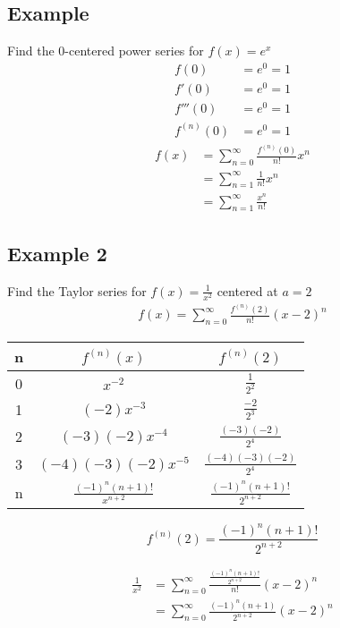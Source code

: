 \documentclass{article}
\theoremstyle{mytheoremstyle}
\theoremstyle{mytheoremstyle}
\theoremstyle{myproblemstyle}
\begin{document}
    \subsection*{Example}
    Find the 0-centered power series for $f(x)=e^x$
    \begin{align*}
        f(0) &= e^0 = 1 \\
        f'(0) &= e^0 = 1 \\
        f'''(0) &= e^0 = 1 \\
        f^{(n)}(0) &= e^0 = 1
    \end{align*}
    \begin{align*}
        f(x) &= \sum_{n=0}^{\infty} \frac{f^{(n)}(0)}{n!} x^n \\
             &= \sum_{n=1}^{\infty} \frac{1}{n!} x^n \\
             &= \sum_{n=1}^{\infty} \frac{x^n}{n!}
    \end{align*}

    \subsection*{Example 2}
    Find the Taylor series for $f(x) = \frac{1}{x^2}$ centered at $a=2$
    \begin{align*}
        f(x) = \sum_{n=0}^{\infty} \frac{f^{(n)}(2)}{n!} (x-2)^n
    \end{align*}
    \begin{center}
    \renewcommand{\arraystretch}{2}
    \begin{tabular}[c]{c|c|c}
        n & $f^{(n)}(x)$ & $f^{(n)}(2)$ \\
        \hline
        0 & $x^{-2}$ & $\frac{1}{2^2}$ \\
        1 & $(-2)x^{-3}$ & $\frac{-2}{2^3}$ \\
        2 & $(-3)(-2)x^{-4}$ & $\frac{(-3)(-2)}{2^4}$ \\
        3 & $(-4)(-3)(-2)x^{-5}$ & $\frac{(-4)(-3)(-2)}{2^4}$ \\
        n & $\frac{(-1)^n(n+1)!}{x^{n+2}}$ & $\frac{(-1)^n(n+1)!}{2^{n+2}}$ \\
    \end{tabular}
    \end{center}
    \[
        f^{(n)}(2) = \frac{(-1)^n (n+1)!}{2^{n+2}}
    \]

    \begin{align*}
        \frac{1}{x^2} &= \sum_{n=0}^{\infty} \frac{\frac{(-1)^n (n+1)!}{2^{n+2}}}{n!} (x-2)^n \\
        &= \sum_{n=0}^{\infty} \frac{(-1)^n(n+1)}{2^{n+2}} (x-2)^n
    \end{align*}
\end{document}
